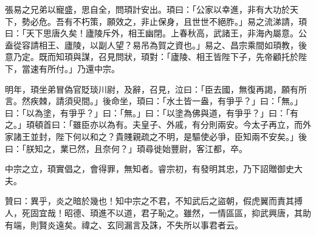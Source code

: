 \begin{pinyinscope}
 張易之兄弟以寵盛，思自全，問頊計安出。頊曰：「公家以幸進，非有大功於天下，勢必危。吾有不朽策，願效之，非止保身，且世世不絕胙。」易之流涕請，頊曰：「天下思唐久矣！廬陵斥外，相王幽閉。上春秋高，武諸王，非海內屬意。公盍從容請相王、廬陵，以副人望？易吊為賀之資也。」易之、昌宗乘間如頊教，後意乃定。既而知頊與謀，召見問狀，頊對：「廬陵、相王皆陛下子，先帝顧托於陛下，當速有所付。」乃還中宗。



 明年，頊坐弟冒偽官貶琰川尉，及辭，召見，泣曰：「臣去國，無復再謁，願有所言。然疾棘，請須臾間。」後命坐，頊曰：「水土皆一盎，有爭乎？」曰：「無。」曰：「以為塗，有爭乎？」曰：「無。」曰：「以塗為佛與道，有爭乎？」曰：「有之。」頊頓首曰：「雖臣亦以為有。夫皇子、外戚，有分則兩安。今太子再立，而外家諸王並封，陛下何以和之？貴賤親疏之不明，是驅使必爭，臣知兩不安矣。」後曰：「朕知之，業已然，且奈何？」頊尋徙始豐尉，客江都，卒。



 中宗之立，頊實倡之，會得罪，無知者。睿宗初，有發明其忠，乃下詔贈御史大夫。



 贊曰：異乎，炎之暗於幾也！知中宗之不君，不知武后之盜朝，假虎翼而責其搏人，死固宜哉！昭德、頊進不以道，君子恥之。雖然，一情區區，抑武興唐，其助有端，則賢炎遠矣。禕之、玄同漏言及誅，不失所以事君者云。



\end{pinyinscope}